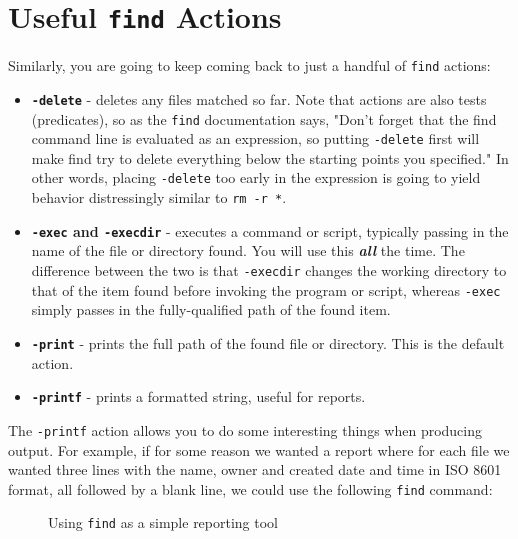 \documentclass[10pt,american,]{book}
\numberwithin{figure}{chapter}
\DeclareRobustCommand{\drcap}[1]{\begin{figure}[H]\caption{#1}\end{figure}}
\begin{document}
\section*{\texorpdfstring{Useful \texttt{find}
Actions}{Useful find Actions}}\label{useful-find-actions}

Similarly, you are going to keep coming back to just a handful of
\texttt{find} actions:

\begin{itemize}
\item
  \textbf{\texttt{-delete}} - deletes any files matched so far. Note
  that actions are also tests (predicates), so as the \texttt{find}
  documentation says, "Don't forget that the find command line is
  evaluated as an expression, so putting \texttt{-delete} first will
  make find try to delete everything below the starting points you
  specified." In other words, placing \texttt{-delete} too early in the
  expression is going to yield behavior distressingly similar to
  \texttt{rm\ -r\ *}.
\item
  \textbf{\texttt{-exec} and \texttt{-execdir}} - executes a command or
  script, typically passing in the name of the file or directory found.
  You will use this \textbf{\emph{all}} the time. The difference between
  the two is that \texttt{-execdir} changes the working directory to
  that of the item found before invoking the program or script, whereas
  \texttt{-exec} simply passes in the fully-qualified path of the found
  item.
\item
  \textbf{\texttt{-print}} - prints the full path of the found file or
  directory. This is the default action.
\item
  \textbf{\texttt{-printf}} - prints a formatted string, useful for
  reports.
\end{itemize}

The \texttt{-printf} action allows you to do some interesting things
when producing output. For example, if for some reason we wanted a
report where for each file we wanted three lines with the name, owner
and created date and time in ISO 8601 format, all followed by a blank
line, we could use the following \texttt{find} command:

\drcap{Using \texttt{find} as a simple reporting tool}
\end{document}
